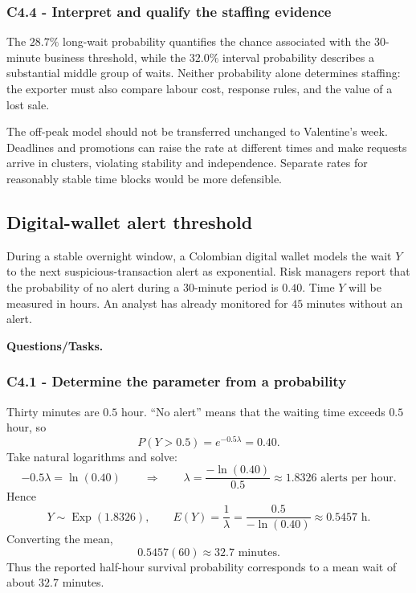 \subsubsection*{C4.4 - Interpret and qualify the staffing evidence}\label{subsec:c4-applied-logistics-d}
The $28.7\%$ long-wait probability quantifies the chance associated with the
30-minute business threshold, while the $32.0\%$ interval probability
describes a substantial middle group of waits.  Neither probability alone
determines staffing: the exporter must also compare labour cost, response
rules, and the value of a lost sale.

The off-peak model should not be transferred unchanged to Valentine's week.
Deadlines and promotions can raise the rate at different times and make
requests arrive in clusters, violating stability and independence.  Separate
rates for reasonably stable time blocks would be more defensible.

\subsection{Digital-wallet alert threshold}\label{sec:c4-applied-wallet}
During a stable overnight window, a Colombian digital wallet models the wait
$Y$ to the next suspicious-transaction alert as exponential.  Risk managers
report that the probability of no alert during a 30-minute period is $0.40$.
Time $Y$ will be measured in hours.  An analyst has already monitored for
$45$ minutes without an alert.

\textbf{Questions/Tasks.}
\begin{enumerate}
\end{enumerate}

\subsubsection*{C4.1 - Determine the parameter from a probability}\label{subsec:c4-applied-wallet-a}
Thirty minutes are $0.5$ hour.  ``No alert'' means that the waiting time
exceeds $0.5$ hour, so
\[
 P(Y>0.5)=e^{-0.5\lambda}=0.40.
\]
Take natural logarithms and solve:
\[
 -0.5\lambda=\ln(0.40)
 \qquad\Longrightarrow\qquad
 \lambda=\frac{-\ln(0.40)}{0.5}
 \approx1.8326\text{ alerts per hour}.
\]
Hence
\[
 Y\sim\operatorname{Exp}(1.8326),
 \qquad
 E(Y)=\frac1\lambda
 =\frac{0.5}{-\ln(0.40)}
 \approx0.5457\text{ h}.
\]
Converting the mean,
\[
 0.5457(60)\approx32.7\text{ minutes}.
\]
Thus the reported half-hour survival probability corresponds to a mean wait
of about $32.7$ minutes.

